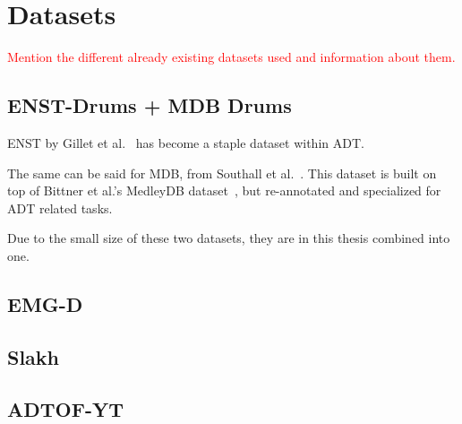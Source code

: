 \chapter{Datasets}

\textcolor{red}{Mention the different already existing datasets used and information about them.}

\section{ENST-Drums + MDB Drums}

\gls{ENST} by Gillet et al.~\cite{gillet_2006_7432188} has become a staple dataset within \gls{ADT}. 

The same can be said for \gls{MDB}, from Southall et al.~\cite{southall2017mdb}. This dataset is built on top of Bittner et al.'s MedleyDB dataset~\cite{rachel_bittner_2014_1438309}, but re-annotated and specialized for \gls{ADT} related tasks.

Due to the small size of these two datasets, they are in this thesis combined into one. 

\section{EMG-D}

\section{Slakh}

\section{ADTOF-YT}